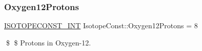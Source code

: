 \subsubsection{\texorpdfstring{Oxygen12\+Protons}{Oxygen12Protons}}
{\footnotesize\ttfamily \mbox{\hyperlink{group___isotope_const-_macros_ga5f18360b3e99483a35c32d789e62621c}{I\+S\+O\+T\+O\+P\+E\+C\+O\+N\+S\+T\+\_\+\+I\+NT}} Isotope\+Const\+::\+Oxygen12\+Protons = 8}

\$ \$ Protons in Oxygen-\/12. 